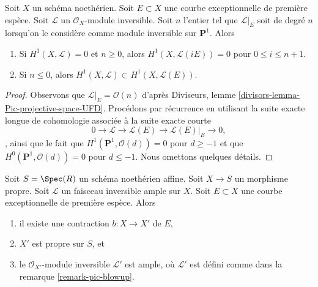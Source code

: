 \begin{lemma} \label{lemma-lift-sections-and-h1} Soit $X$ un schéma noethérien. Soit $E \subset X$ une courbe exceptionnelle de première espèce. Soit $\mathcal{L}$ un $\mathcal{O}_X$-module inversible. Soit $n$ l'entier tel que $\mathcal{L}|_E$ soit de degré $n$ lorsqu'on le considère comme module inversible sur $\mathbf{P}^1$. Alors \begin{enumerate} \item Si $H^1(X, \mathcal{L}) = 0$ et $n \geq 0$, alors $H^1(X, \mathcal{L}(iE)) = 0$ pour $0 \leq i \leq n + 1$. \item Si $n \leq 0$, alors $H^1(X, \mathcal{L}) \subset H^1(X, \mathcal{L}(E))$. \end{enumerate} \end{lemma}

\begin{proof} Observons que $\mathcal{L}|_E = \mathcal{O}(n)$ d'après Diviseurs, lemme \ref{divisors-lemma-Pic-projective-space-UFD}. Procédons par récurrence en utilisant la suite exacte longue de cohomologie associée à la suite exacte courte $$
0 \to \mathcal{L} \to \mathcal{L}(E) \to \mathcal{L}(E)|_E \to 0,
$$, ainsi que le fait que $H^1(\mathbf{P}^1, \mathcal{O}(d)) = 0$ pour $d \geq -1$ et que $H^0(\mathbf{P}^1, \mathcal{O}(d)) = 0$ pour $d \leq -1$. Nous omettons quelques détails. \end{proof}

\begin{lemma} \label{lemma-contract-ample} Soit $S = \Spec(R)$ un schéma noethérien affine. Soit $X \to S$ un morphisme propre. Soit $\mathcal{L}$ un faisceau inversible ample sur $X$. Soit $E \subset X$ une courbe exceptionnelle de première espèce. Alors \begin{enumerate} \item il existe une contraction $b : X \to X'$ de $E$, \item $X'$ est propre sur $S$, et \item le $\mathcal{O}_{X'}$-module inversible $\mathcal{L}'$ est ample, où $\mathcal{L}'$ est défini comme dans la remarque \ref{remark-pic-blowup}. \end{enumerate} \end{lemma}

